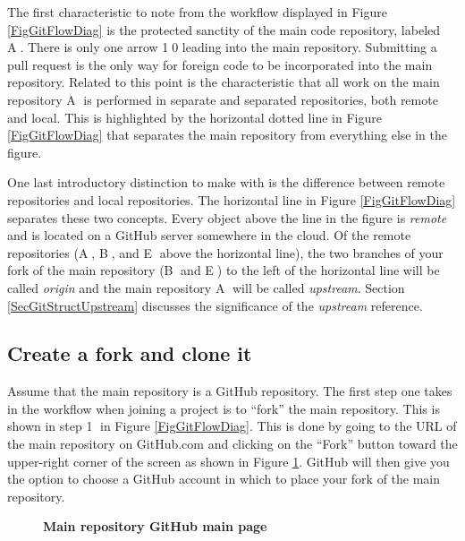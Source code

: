   The first characteristic to note from the workflow displayed in Figure \ref{FigGitFlowDiag} is the protected sanctity of the main code repository, labeled \textcircled{A}. There is only one arrow \textcircled{10} leading into the main repository. Submitting a pull request is the only way for foreign code to be incorporated into the main repository. Related to this point is the characteristic that all work on the main repository \textcircled{A} is performed in separate and separated repositories, both remote and local. This is highlighted by the horizontal dotted line in Figure \ref{FigGitFlowDiag} that separates the main repository from everything else in the figure.

  One last introductory distinction to make with \git is the difference between remote repositories and local repositories. The horizontal line in Figure \ref{FigGitFlowDiag} separates these two concepts. Every object above the line in the figure is \textit{remote} and is located on a GitHub server somewhere in the cloud. Of the remote repositories (\textcircled{A}, \textcircled{B}, and \textcircled{E} above the horizontal line), the two branches of your fork of the main repository (\textcircled{B} and \textcircled{E}) to the left of the horizontal line will be called \textit{origin} and the main repository \textcircled{A} will be called \textit{upstream}. Section \ref{SecGitStructUpstream} discusses the significance of the \textit{upstream} reference.


  \subsection{Create a fork and clone it}\label{SecGitStructFork}

    Assume that the main repository is a GitHub repository. The first step one takes in the \git workflow when joining a project is to ``fork'' the main repository. This is shown in step \textcircled{1} in Figure \ref{FigGitFlowDiag}. This is done by going to the URL of the main repository on GitHub.com and clicking on the ``Fork'' button toward the upper-right corner of the screen as shown in Figure \ref{FigGitMainRepoMain}. GitHub will then give you the option to choose a GitHub account in which to place your fork of the main repository.

    \begin{figure}[htb]\centering\captionsetup{width=6.0in}
      \caption{\textbf{Main repository GitHub main page}}\label{FigGitMainRepoMain}
    \end{figure}

